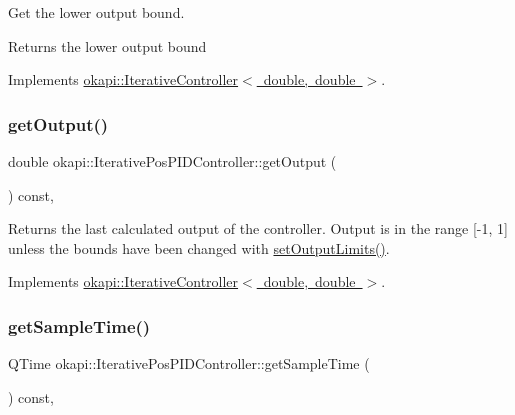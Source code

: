 Get the lower output bound.

\begin{DoxyReturn}{Returns}
the lower output bound 
\end{DoxyReturn}


Implements \mbox{\hyperlink{classokapi_1_1IterativeController_a4d271df97caeedbcc807b714a48eaa30}{okapi\+::\+Iterative\+Controller$<$ double, double $>$}}.

\mbox{\label{classokapi_1_1IterativePosPIDController_aeb015338c954bf1a7ef0b792ea6c490c}} 
\subsubsection{\texorpdfstring{getOutput()}{getOutput()}}
{\footnotesize\ttfamily double okapi\+::\+Iterative\+Pos\+P\+I\+D\+Controller\+::get\+Output (\begin{DoxyParamCaption}{ }\end{DoxyParamCaption}) const\hspace{0.3cm}{\ttfamily [override]}, {\ttfamily [virtual]}}

Returns the last calculated output of the controller. Output is in the range \mbox{[}-\/1, 1\mbox{]} unless the bounds have been changed with \mbox{\hyperlink{classokapi_1_1IterativePosPIDController_a64c3fddb91ceaac4e747404afc5295ae}{set\+Output\+Limits()}}. 

Implements \mbox{\hyperlink{classokapi_1_1IterativeController_a83e0aac640804974f0e06936b9f7898a}{okapi\+::\+Iterative\+Controller$<$ double, double $>$}}.

\mbox{\label{classokapi_1_1IterativePosPIDController_a12d70574d5234d2928d77114e0c90df9}} 
\subsubsection{\texorpdfstring{getSampleTime()}{getSampleTime()}}
{\footnotesize\ttfamily Q\+Time okapi\+::\+Iterative\+Pos\+P\+I\+D\+Controller\+::get\+Sample\+Time (\begin{DoxyParamCaption}{ }\end{DoxyParamCaption}) const\hspace{0.3cm}{\ttfamily [override]}, {\ttfamily [virtual]}}

